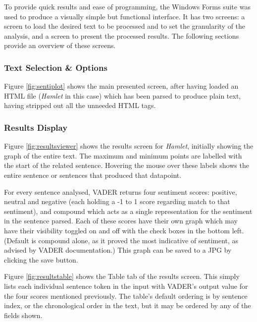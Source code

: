 \documentclass{article}
\begin{document}
{        To provide quick results and ease of programming, the Windows Forms suite was used to produce a visually simple but functional interface. It has two screens: a screen to load the desired text to be processed and to set the granularity of the analysis, and a screen to present the processed results. The following sections provide an overview of these screens.
    \subsubsection{Text Selection \& Options}
    Figure \ref{fig:sentiplot} shows the main presented screen, after having loaded an HTML file (\textit{Hamlet} in this case) which has been parsed to produce plain text, having stripped out all the unneeded HTML tags.
    \subsubsection{Results Display}
        Figure \ref{fig:resultsviewer} shows the results screen for \textit{Hamlet}, initially showing the graph of the entire text. The maximum and minimum points are labelled with the start of the related sentence. Hovering the mouse over these labels shows the entire sentence or sentences that produced that datapoint.

        For every sentence analysed, VADER returns four sentiment scores: positive, neutral and negative (each holding a -1 to 1 score regarding match to that sentiment), and compound which acts as a single representation for the sentiment in the sentence parsed. Each of these scores have their own graph which may have their visibility toggled on and off with the check boxes in the bottom left. (Default is compound alone, as it proved the most indicative of sentiment, as advised by VADER documentation.) This graph can be saved to a JPG by clicking the save button.

        Figure \ref{fig:resultstable} shows the Table tab of the results screen. This simply lists each individual sentence token in the input with VADER’s output value for the four scores mentioned previously. The table’s default ordering is by sentence index, or the chronological order in the text, but it may be ordered by any of the fields shown.

}
\end{document}
